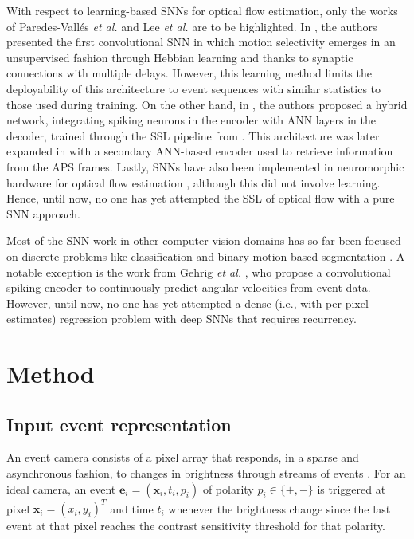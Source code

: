 With respect to learning-based SNNs for optical flow estimation, only the works of Paredes-Vall\'es \textit{et al.} \cite{paredes-valles2020unsupervised} and Lee \textit{et al.} \cite{lee2020spikeflownet, lee2022fusionflownet} are to be highlighted. In \cite{paredes-valles2020unsupervised}, the authors presented the first convolutional SNN in which motion selectivity emerges in an unsupervised fashion through Hebbian learning \cite{hebb2005organization} and thanks to synaptic connections with multiple delays. However, this learning method limits the deployability of this architecture to event sequences with similar statistics to those used during training. On the other hand, in \cite{lee2020spikeflownet}, the authors proposed a hybrid network, integrating spiking neurons in the encoder with ANN layers in the decoder, trained through the SSL pipeline from \cite{zhu2018evflownet}. This architecture was later expanded in \cite{lee2022fusionflownet} with a secondary ANN-based encoder used to retrieve information from the APS frames. Lastly, SNNs have also been implemented in neuromorphic hardware for optical flow estimation \cite{haessig2018spiking}, although this did not involve learning. Hence, until now, no one has yet attempted the SSL of optical flow with a pure SNN approach.

Most of the SNN work in other computer vision domains has so far been focused on discrete problems like classification \cite{cordone2021learning,fang2021incorporating,xing2020new,zheng2021going} and binary motion-based segmentation \cite{parameshwara2021spikems}. A notable exception is the work from Gehrig \textit{et al.} \cite{gehrig2020eventbased}, who propose a convolutional spiking encoder to continuously predict angular velocities from event data. However, until now, no one has yet attempted a dense (i.e., with per-pixel estimates) regression problem with deep SNNs that requires recurrency. 

\section{Method}\label{sec:neurips_method}

\subsection*{Input event representation}\label{sec:neurips_input}

An event camera consists of a pixel array that responds, in a sparse and asynchronous fashion, to changes in brightness through streams of events \cite{gallego2020eventbased}. For an ideal camera, an event $\boldsymbol{e}_i=(\boldsymbol{x}_i,t_i,p_i)$ of polarity $p_i\in\{+,-\}$ is triggered at pixel $\boldsymbol{x}_i=(x_i,y_i)^T$ and time $t_i$ whenever the brightness change since the last event at that pixel reaches the contrast sensitivity threshold for that polarity.

